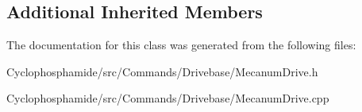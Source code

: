 \subsection*{Additional Inherited Members}


The documentation for this class was generated from the following files\+:\begin{DoxyCompactItemize}
\item 
Cyclophosphamide/src/\+Commands/\+Drivebase/Mecanum\+Drive.\+h\item 
Cyclophosphamide/src/\+Commands/\+Drivebase/Mecanum\+Drive.\+cpp\end{DoxyCompactItemize}
